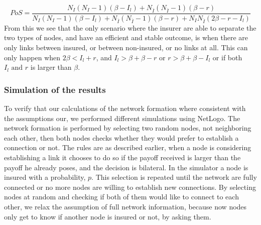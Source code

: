\begin{equation}
PoS=\frac{N_{I}(N_{I}-1)(\beta-I_{l})+N_{\overline{I}}(N_{\overline{I}}-1)(\beta-r)}{N_{I}(N_{I}-1)(\beta-I_{l})+N_{\overline{I}}(N_{\overline{I}}-1)(\beta-r)+N_{I}N_{\overline{I}}(2\beta-r-I_{l})}
\label{eq:model2-pos}
\end{equation}
From this we see that the only scenario where the insurer are able to separate the two types of nodes, and have an efficient and stable outcome, is when there are only links between insured, or between non-insured, or no links at all.
This can only happen when $2\beta<I_{l}+r$, and $I_{l}>\beta+\beta-r$ or $r>\beta+\beta-I_{l}$ or if both $I_{l} \text{ and }r$ is larger than $\beta$.

\subsubsection{Simulation of the results}
To verify that our calculations of the network formation where consistent with the assumptions our, we performed different simulations using NetLogo. The network formation is performed by selecting two random nodes, not neighboring each other, then both nodes checks whether they would prefer to establish a connection or not. 
The rules are as described earlier, when a node is considering establishing a link it chooses to do so if the payoff received is larger than the payoff he already poses, and the decision is bilateral.
In the simulator a node is insured with a probability, $p$. This selection is repeated until the network are fully connected or no more nodes are willing to establish new connections.
By selecting nodes at random and checking if both of them would like to connect to each other, we relax the assumption of full network information, because now nodes only get to know if another node is insured or not, by asking them.

